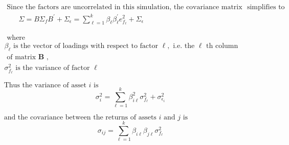 \documentclass[11pt]{article}
\begin{document}
\(\begin{array}{l}{\text { Since the factors are uncorrelated in this simulation, the covariance matrix }\text { simplifies to}} \\ {\qquad \Sigma=B \Sigma_{f} B^{\prime}+\Sigma_{\epsilon}=\sum_{\ell=1}^{k} \beta_{\ell} \beta_{\ell}^{\prime} e_{f_{\ell}}^{2}+\Sigma_{\epsilon}}\end{array}\)

\(\begin{array}{l}{\text { where }} \\ {\beta_{\ell} \text { is the vector of loadings with respect to factor } \ell, \text { i.e. the } \ell \text { th column }} \\ {\text { of matrix } \boldsymbol{B} \text { , }} \\ {\sigma_{f_{\ell}}^{2} \text { is the variance of factor } \ell}\end{array}\)

\(\text { Thus the variance of asset } i \text { is }\)
\[\sigma_{i}^{2}=\sum_{\ell=1}^{k} \beta_{i \ell}^{2} \sigma_{f_{\ell}}^{2}+\sigma_{\epsilon_{i}}^{2} \]

\(\text { and the covariance between the returns of assets } i \text { and } j \text { is }\)
\[ \sigma_{i j}=\sum_{\ell=1}^{k} \beta_{i \ell} \beta_{j \ell} \sigma_{f_{\ell}}^{2}\]
\end{document}
